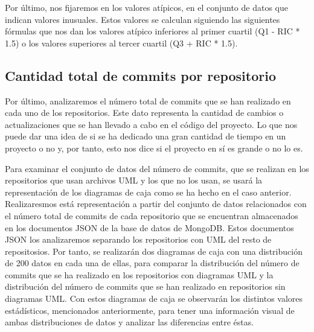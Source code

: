 \documentclass[a4paper, 12pt]{book}
\begin{document}
Por último, nos fijaremos en los valores atípicos, en el conjunto de datos que indican valores inusuales.
Estos valores se calculan siguiendo las siguientes fórmulas que nos dan los valores atípico inferiores al primer cuartil (Q1 - RIC * 1.5)  o los valores superiores al tercer cuartil (Q3 + RIC * 1.5). 



\subsection{Cantidad total de commits por repositorio} %
\label{sec:cantidad total de commits por repositorio}

Por último, analizaremos el número total de commits que se han realizado en cada uno de los repositorios.
Este dato representa la cantidad de cambios o actualizaciones que se han llevado a cabo en el código del proyecto.
Lo que nos puede dar una idea de si se ha dedicado una gran cantidad de tiempo en un proyecto o no y, por tanto, esto nos dice si el proyecto en sí es grande o no lo es. 


Para examinar el conjunto de datos del número de commits, que se realizan en los repositorios que usan archivos UML y los que no los usan, se usará la representación de  los diagramas de caja como se ha hecho en el caso anterior.
Realizaresmos está representación a partir del conjunto de datos relacionados con el número total de commits de cada repositorio que se encuentran almacenados en los documentos JSON de la base de datos de MongoDB.
Estos documentos JSON los analizaremos separando los repositorios con UML del resto de repositosios. 
Por tanto, se realizarán dos diagramas de caja con una distribución de 200 datos en cada una de ellas, para comparar la distribución del número de commits que se ha realizado en los repositorios con diagramas UML y la distribución del número de commits que se han realizado en repositorios sin diagramas UML.
Con estos diagramas de caja se observarán los distintos valores estádísticos, mencionados anteriormente, para tener una información visual de ambas distribuciones de datos y analizar las diferencias entre éstas.  


\end{document}
